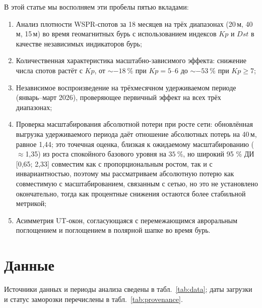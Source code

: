 \documentclass{agujournal2019}
\begin{document}
В этой статье мы восполняем эти пробелы пятью вкладами:

\begin{enumerate}
	\item Анализ плотности WSPR-спотов за 18 месяцев на трёх диапазонах
	      (20\,м, 40\,м, 15\,м) во время геомагнитных бурь с использованием
	      индексов $Kp$ и $Dst$ в качестве независимых индикаторов бурь;
	\item Количественная характеристика масштабно-зависимого эффекта:
	      снижение числа спотов растёт с $Kp$, от
	      $\sim\SI{-18}{\percent}$ при $Kp = 5\text{--}6$ до
	      $\sim\SI{-53}{\percent}$ при $Kp \ge 7$;
	\item Независимое воспроизведение на трёхмесячном удерживаемом периоде (январь--март 2026), проверяющее первичный
	      эффект на всех трёх диапазонах;
	\item Проверка масштабирования абсолютной потери при росте сети:
	      обновлённая выгрузка удерживаемого периода даёт отношение абсолютных потерь на 40\,м, равное 1,44; это точечная оценка, близкая к ожидаемому масштабированию ($\approx$1,35) из роста
	      спокойного базового уровня на $\SI{+35}{\percent}$, но широкий
	      95 \% ДИ [0,65; 2,33] совместим как с пропорциональным ростом,
	      так и с инвариантностью, поэтому мы рассматриваем абсолютную потерю как совместимую с масштабированием, связанным с сетью,
	      но это не установлено окончательно, тогда как процентные снижения остаются более стабильной метрикой;
	\item Асимметрия UT-окон, согласующаяся с перемежающимся авроральным
	      поглощением и поглощением в полярной шапке во время бурь.
\end{enumerate}


\section{Данные}

Источники данных и периоды анализа сведены в табл.~\ref{tab:data};
даты загрузки и статус заморозки перечислены в табл.~\ref{tab:provenance}.
\end{document}
